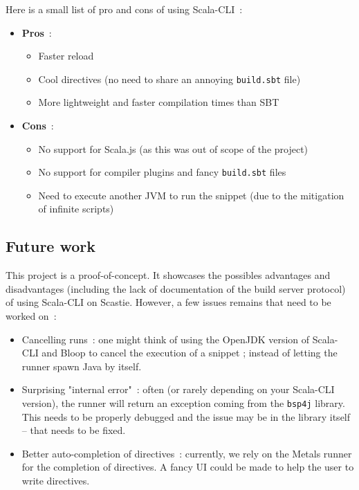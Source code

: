 \documentclass{article}
\begin{document}
Here is a small list of pro and cons of using Scala-CLI~:

\begin{itemize}
    \item \textbf{Pros}~: \begin{itemize}
        \item Faster reload
        \item Cool directives (no need to share an annoying \lstinline{build.sbt} file)
        \item More lightweight and faster compilation times than SBT
    \end{itemize}
    \item \textbf{Cons}~: \begin{itemize}
        \item No support for Scala.js (as this was out of scope of the project)
        \item No support for compiler plugins and fancy \lstinline{build.sbt} files
        \item Need to execute another JVM to run the snippet (due to the mitigation of infinite scripts)
    \end{itemize}
\end{itemize}

\subsection{Future work}

This project is a proof-of-concept. It showcases the possibles advantages and disadvantages (including the lack of documentation of the build server protocol) of using Scala-CLI on Scastie.
However, a few issues remains that need to be worked on~:

\begin{itemize}
    \item Cancelling runs~: one might think of using the OpenJDK version of Scala-CLI and Bloop to cancel the execution of a snippet ; instead of letting the runner spawn Java by itself.
    \item Surprising "internal error"~: often (or rarely depending on your Scala-CLI version), the runner will return an exception coming from the \lstinline{bsp4j} library. This needs to be properly debugged and the issue may be in the library itself -- that needs to be fixed.
    \item Better auto-completion of directives~: currently, we rely on the Metals runner for the completion of directives. A fancy UI could be made to help the user to write directives.
\end{itemize}
\end{document}
